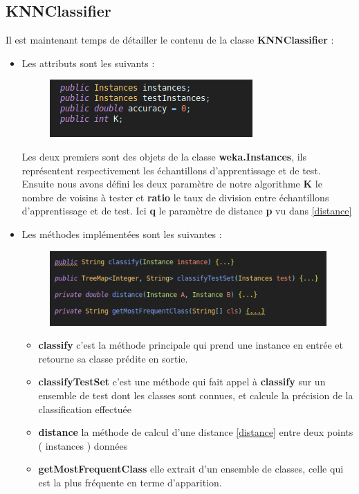 		\subsection*{KNNClassifier} 
		Il est maintenant temps de détailler le contenu de la classe \textbf{KNNClassifier} : 
		\begin{itemize}
			\item Les attributs sont les suivants : 
			\begin{figure}[H]
				\centering
				\includegraphics[width=0.75\linewidth]{knn/images/props.png}
			\end{figure}
			\par 
			Les deux premiers sont des objets de la classe \textbf{weka.Instances}, ils représentent respectivement les échantillons d'apprentissage et de test. Ensuite nous avons défini les deux paramètre de notre algorithme \textbf{K} le nombre de voisins à tester et \textbf{ratio} le taux de division entre échantillons d'apprentissage et de test. Ici \textbf{q} le paramètre de distance \textbf{p} vu dans \ref{distance}
			
			
			\item Les méthodes implémentées sont les suivantes : 
				\begin{figure}[H]
				\centering
				\includegraphics[width=0.75\linewidth]{knn/images/meths.png}
			\end{figure}
			\begin{itemize}
				\item \textbf{classify} c'est la méthode principale qui prend une instance en entrée et retourne sa classe prédite en sortie.
				\item \textbf{classifyTestSet} c'est une méthode qui fait appel à \textbf{classify} sur un ensemble de test dont les classes sont connues, et calcule la précision de la classification effectuée
				\item \textbf{distance} la méthode de calcul d'une distance \ref{distance} entre deux points ( instances ) données
				\item \textbf{getMostFrequentClass} elle extrait d'un ensemble de classes, celle qui est la plus fréquente en terme d'apparition.
			\end{itemize}
		\end{itemize}

